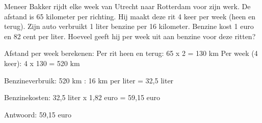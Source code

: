 \begin{opgave}
Meneer Bakker rijdt elke week van Utrecht naar Rotterdam voor zijn werk. De 
afstand is 65 kilometer per richting. Hij maakt deze rit 4 keer per week 
(heen en terug). Zijn auto verbruikt 1 liter benzine per 16 kilometer. 
Benzine kost 1 euro en 82 cent per liter. Hoeveel geeft hij per week uit aan 
benzine voor deze ritten?
\end{opgave}

\begin{oplossing}
Afstand per week berekenen:
Per rit heen en terug: 65 x 2 = 130 km
Per week (4 keer): 4 x 130 = 520 km

Benzineverbruik:
520 km : 16 km per liter = 32,5 liter

Benzinekosten:
32,5 liter x 1,82 euro = 59,15 euro

Antwoord: 59,15 euro
\end{oplossing}